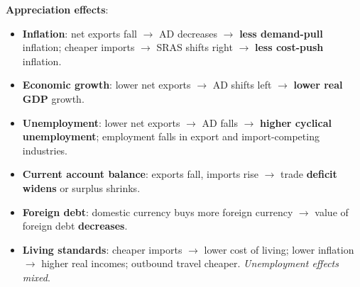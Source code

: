 \textbf{Appreciation effects}:
\begin{itemize}
  \item \textbf{Inflation}: net exports fall $\to$ AD decreases $\to$ \textbf{less demand-pull} inflation; cheaper imports $\to$ SRAS shifts right $\to$ \textbf{less cost-push} inflation.
  \item \textbf{Economic growth}: lower net exports $\to$ AD shifts left $\to$ \textbf{lower real GDP} growth.
  \item \textbf{Unemployment}: lower net exports $\to$ AD falls $\to$ \textbf{higher cyclical unemployment}; employment falls in export and import-competing industries.
  \item \textbf{Current account balance}: exports fall, imports rise $\to$ trade \textbf{deficit widens} or surplus shrinks.
  \item \textbf{Foreign debt}: domestic currency buys more foreign currency $\to$ value of foreign debt \textbf{decreases}.
  \item \textbf{Living standards}: cheaper imports $\to$ lower cost of living; lower inflation $\to$ higher real incomes; outbound travel cheaper. \textit{Unemployment effects mixed}.
\end{itemize}
